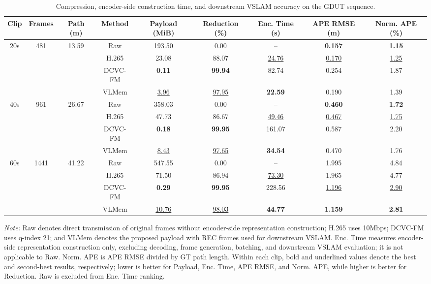 \begin{table}[!t]
\renewcommand{\arraystretch}{1.10}
\caption{Compression, encoder-side construction time, and downstream VSLAM accuracy on the GDUT sequence.}
\label{tab:payload_runtime}
\centering
\footnotesize
\setlength{\tabcolsep}{2.4pt}
\begin{tabular*}{\textwidth}{@{\extracolsep{\fill}}ccccccccc@{}}
\toprule
Clip & Frames & Path (m) & Method & Payload (MiB) & Reduction (\%) & Enc. Time (s) & APE RMSE (m) & Norm. APE (\%) \\
\midrule
\multirow{4}{*}{20s} & \multirow{4}{*}{481} & \multirow{4}{*}{13.59} & Raw & 193.50 & 0.00 & -- & \textbf{0.157} & \textbf{1.15} \\
 & & & H.265 & 23.08 & 88.07 & \underline{24.76} & \underline{0.170} & \underline{1.25} \\
 & & & DCVC-FM & \textbf{0.11} & \textbf{99.94} & 82.74 & 0.254 & 1.87 \\
 & & & VLMem & \underline{3.96} & \underline{97.95} & \textbf{22.59} & 0.190 & 1.39 \\
\midrule
\multirow{4}{*}{40s} & \multirow{4}{*}{961} & \multirow{4}{*}{26.67} & Raw & 358.03 & 0.00 & -- & \textbf{0.460} & \textbf{1.72} \\
 & & & H.265 & 47.73 & 86.67 & \underline{49.46} & \underline{0.467} & \underline{1.75} \\
 & & & DCVC-FM & \textbf{0.18} & \textbf{99.95} & 161.07 & 0.587 & 2.20 \\
 & & & VLMem & \underline{8.43} & \underline{97.65} & \textbf{34.54} & 0.470 & 1.76 \\
\midrule
\multirow{4}{*}{60s} & \multirow{4}{*}{1441} & \multirow{4}{*}{41.22} & Raw & 547.55 & 0.00 & -- & 1.995 & 4.84 \\
 & & & H.265 & 71.50 & 86.94 & \underline{73.30} & 1.965 & 4.77 \\
 & & & DCVC-FM & \textbf{0.29} & \textbf{99.95} & 228.56 & \underline{1.196} & \underline{2.90} \\
 & & & VLMem & \underline{10.76} & \underline{98.03} & \textbf{44.77} & \textbf{1.159} & \textbf{2.81} \\
\bottomrule
\end{tabular*}%
\vspace{0.2em}

\begin{minipage}{\textwidth}
\footnotesize \emph{Note:} Raw denotes direct transmission of original frames without encoder-side representation construction; H.265 uses 10Mbps; DCVC-FM uses q-index 21; and VLMem denotes the proposed payload with REC frames used for downstream VSLAM. Enc. Time measures encoder-side representation construction only, excluding decoding, frame generation, batching, and downstream VSLAM evaluation; it is not applicable to Raw. Norm. APE is APE RMSE divided by GT path length. Within each clip, bold and underlined values denote the best and second-best results, respectively; lower is better for Payload, Enc. Time, APE RMSE, and Norm. APE, while higher is better for Reduction. Raw is excluded from Enc. Time ranking.
\end{minipage}
\end{table}
